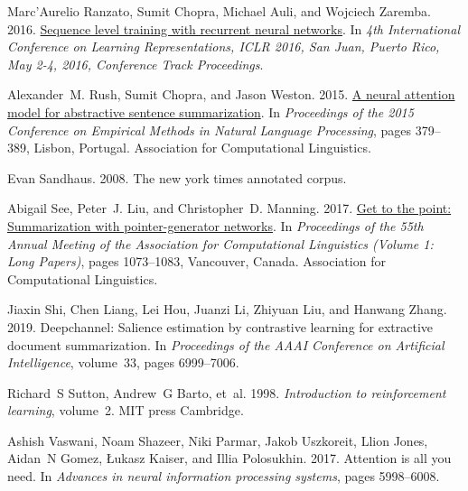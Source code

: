\documentclass[11pt,a4paper]{article}
\begin{document}
\begin{thebibliography}{46}
Marc'Aurelio Ranzato, Sumit Chopra, Michael Auli, and Wojciech Zaremba. 2016.
\newblock \href {http://arxiv.org/abs/1511.06732} {Sequence level training with
  recurrent neural networks}.
\newblock In \emph{4th International Conference on Learning Representations,
  {ICLR} 2016, San Juan, Puerto Rico, May 2-4, 2016, Conference Track
  Proceedings}.

Alexander~M. Rush, Sumit Chopra, and Jason Weston. 2015.
\newblock \href {https://doi.org/10.18653/v1/D15-1044} {A neural attention
  model for abstractive sentence summarization}.
\newblock In \emph{Proceedings of the 2015 Conference on Empirical Methods in
  Natural Language Processing}, pages 379--389, Lisbon, Portugal. Association
  for Computational Linguistics.

Evan Sandhaus. 2008.
\newblock The new york times annotated corpus.

Abigail See, Peter~J. Liu, and Christopher~D. Manning. 2017.
\newblock \href {https://doi.org/10.18653/v1/P17-1099} {Get to the point:
  Summarization with pointer-generator networks}.
\newblock In \emph{Proceedings of the 55th Annual Meeting of the Association
  for Computational Linguistics (Volume 1: Long Papers)}, pages 1073--1083,
  Vancouver, Canada. Association for Computational Linguistics.

Jiaxin Shi, Chen Liang, Lei Hou, Juanzi Li, Zhiyuan Liu, and Hanwang Zhang.
  2019.
\newblock Deepchannel: Salience estimation by contrastive learning for
  extractive document summarization.
\newblock In \emph{Proceedings of the AAAI Conference on Artificial
  Intelligence}, volume~33, pages 6999--7006.

Richard~S Sutton, Andrew~G Barto, et~al. 1998.
\newblock \emph{Introduction to reinforcement learning}, volume~2.
\newblock MIT press Cambridge.

Ashish Vaswani, Noam Shazeer, Niki Parmar, Jakob Uszkoreit, Llion Jones,
  Aidan~N Gomez, {\L}ukasz Kaiser, and Illia Polosukhin. 2017.
\newblock Attention is all you need.
\newblock In \emph{Advances in neural information processing systems}, pages
  5998--6008.


\end{thebibliography}
\end{document}

